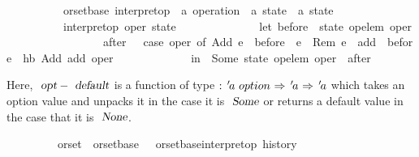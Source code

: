 \begin{isabellebody}
\ \ \ \ \ \ \ \ \ {\isacharparenleft}\ orset{\isacharunderscore}base{\isacharparenright}\ interpret{\isacharunderscore}op\ {\isacharcolon}{\isacharcolon}\ {\isachardoublequoteopen}{\isacharprime}a\ operation\ {\isasymRightarrow}\ {\isacharprime}a\ state\ {\isasymrightharpoonup}\ {\isacharprime}a\ state{\isachardoublequoteclose}\ {\isacharparenleft}{\isachardoublequoteopen}{\isasymlangle}{\isacharunderscore}{\isasymrangle}{\isachardoublequoteclose}\ {\isacharbrackleft}{}{\isacharbrackright}\ {}{}{}{}{\isacharparenright}\ \isanewline
\ \ \ \ \ \ \ \ \ \ {\isachardoublequoteopen}interpret{\isacharunderscore}op\ oper\ state\ {\isasymequiv}\isanewline
\ \ \ \ \ \ \ \ \ \ \ \ \ let\ before\ {\isacharequal}\ state\ {\isacharparenleft}op{\isacharunderscore}elem\ oper{\isacharparenright}{\isacharsemicolon}\isanewline
\ \ \ \ \ \ \ \ \ \ \ \ \ \ \ \ \ after\ \ {\isacharequal}\ case\ oper\ of\ Add\ e\ {\isasymRightarrow}\ before\ {\isasymunion}\ {\isacharbraceleft}e{\isacharbraceright}\ {\isacharbar}\ Rem\ e\ {\isasymRightarrow}\ {\isacharbraceleft}add\ {\isasymin}\ before{\isachardot}\ {\isasymnot}\ hb\ {\isacharparenleft}Add\ add{\isacharparenright}\ oper{\isacharbraceright}\isanewline
\ \ \ \ \ \ \ \ \ \ \ \ \ in\ \ Some\ {\isacharparenleft}state\ {\isacharparenleft}{\isacharparenleft}op{\isacharunderscore}elem\ oper{\isacharparenright}\ {\isacharcolon}{\isacharequal}\ after{\isacharparenright}{\isacharparenright}{\isachardoublequoteclose}
\end{isabellebody}
Here, $\isa{opt}-\isa{default}$ is a function of type ${\isacharcolon}\ {\isachardoublequoteopen}{\isacharprime}a\ option\ {\isasymRightarrow}\ {\isacharprime}a\ {\isasymRightarrow}\ {\isacharprime}a$ which takes an option value and unpacks it in the case it is $\isa{Some}$ or returns a default value in the case that it is $\isa{None}$.

\begin{isabellebody}
\ \ \ \ \ \ \ \ \ orset\ {\isacharequal}\ orset{\isacharunderscore}base\ {\isacharunderscore}\ {\isacharunderscore}\ {\isachardoublequoteopen}orset{\isacharunderscore}base{\isachardot}interpret{\isacharunderscore}op\ history{\isachardoublequoteclose}
\end{isabellebody}

